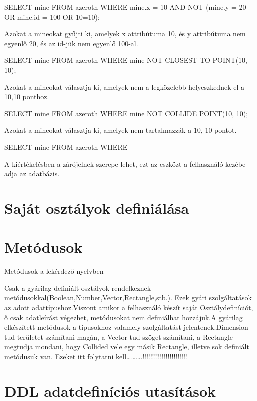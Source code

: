\begin{sql}
SELECT mine FROM azeroth WHERE mine.x = 10 AND NOT (mine.y = 20 OR mine.id = 100 OR 10=10);
\end{sql}
Azokat a mineokat gyűjti ki, amelyek x attribútuma 10, és y attribútuma nem egyenlő 20, és az id-jük nem egyenlő 100-al.
\begin{sql}

\begin{sql}
SELECT mine FROM azeroth WHERE mine NOT CLOSEST TO POINT(10, 10);
\end{sql}

Azokat a mineokat választja ki, amelyek nem a legközelebb helyeszkednek el a 10,10 ponthoz.
\begin{sql}
SELECT mine FROM azeroth WHERE mine NOT COLLIDE POINT(10, 10);
\end{sql}
Azokat a mineokat választja ki, amelyek nem tartalmazzák a 10, 10 pontot.
\begin{sql}
SELECT mine FROM azeroth WHERE 
\end{sql}

A kiértékelésben a zárójelnek szerepe lehet, ezt az eszközt a felhasználó kezébe adja az adatbázis.

\section{Saját osztályok definiálása}

\section{Metódusok}

Metódusok a lekérdező nyelvben

Csak a gyárilag definiált osztályok rendelkeznek metódusokkal(Boolean,Number,Vector,Rectangle,stb.).
Ezek gyári szolgáltatások az adott adattípushoz.Viszont amikor a felhasználó készít saját Osztálydefiníciót, ő csak adatleírást végezhet, metódusokat nem definiálhat hozzájuk.A gyárilag elkészített metódusok a típusokhoz valamely szolgáltatást jelentenek.Dimension tud területet számítani magán, a Vector tud szöget számítani, a Rectangle megtudja mondani, hogy Collided vele egy másik Rectangle, illetve sok definiált metódusuk van. Ezeket itt folytatni kell……….!!!!!!!!!!!!!!!!!!!!!!! 

\section{DDL adatdefiníciós utasítások}


\end{sql}
